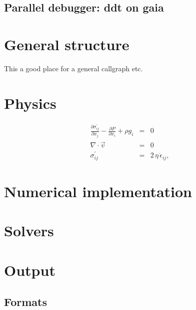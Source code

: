 \documentclass{scrartcl}
\begin{document}
\subsection{Parallel debugger: ddt on gaia}



 
\section{General structure} 
This a good place for a general callgraph etc.




 
\section{Physics}
\begin{eqnarray}
\label{eq:Stokes_stokes}
\frac{\partial \sigma_{ij}^\prime}{\partial x_j} - \frac{\partial P }{\partial x_i} + \rho g_i &= &0 \\
\label{eq:Stokes_massconservation}
\nabla \cdot \vec{v} &= &0 \\
\label{eq:Stokes_hookslaw}
\sigma_{ij}^\prime &= &2\,\eta\,\dot{\epsilon}_{ij}, 
\end{eqnarray}
\section{Numerical implementation}




\section{Solvers}
 
 
 
\section{Output}
 \subsection{Formats}









\end{document}
